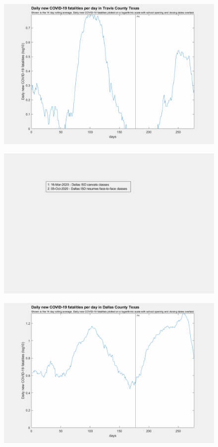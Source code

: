 \documentclass[]{article}
\begin{document}
\begin{figure}[!h]
	\includegraphics[width=\linewidth]{images/travis_fatalities_school_log.png}
	\caption{}
	\label{fig:images/travis_fatalities_school_logLabel}
\end{figure}

\begin{figure}[!h]
	\includegraphics[width=\linewidth]{legends/dallas_school_legend.png}
	\caption{}
	\label{fig:legends/dallas_school_legendLabel}
\end{figure}

\begin{figure}[!h]
	\includegraphics[width=\linewidth]{images/dallas_fatalities_school_log.png}
	\caption{}
	\label{fig:images/dallas_fatalities_school_logLabel}
\end{figure}
\end{document}
